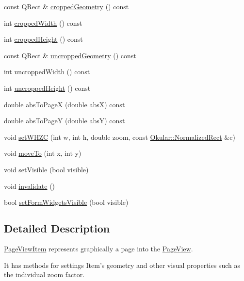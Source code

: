 \begin{DoxyCompactItemize}
\item 
const Q\+Rect \& \hyperlink{classPageViewItem_aa2c3e988ccbe9ee162b73d7f89ab0d02}{cropped\+Geometry} () const 
\item 
int \hyperlink{classPageViewItem_a94c289b7fcbadf14d0b06a68589aa72a}{cropped\+Width} () const 
\item 
int \hyperlink{classPageViewItem_a4e74bfd4a2f4afaf8e905c59293b4978}{cropped\+Height} () const 
\item 
const Q\+Rect \& \hyperlink{classPageViewItem_a5d2e73a003f65b4e95c0c21b1698f835}{uncropped\+Geometry} () const 
\item 
int \hyperlink{classPageViewItem_a240924407ae22bb0489363a6a2d481b9}{uncropped\+Width} () const 
\item 
int \hyperlink{classPageViewItem_af1380fce5dc13a72458ef834c720b128}{uncropped\+Height} () const 
\item 
double \hyperlink{classPageViewItem_ac8c32541cbae1efd5b4ab54f0a4b4576}{abs\+To\+Page\+X} (double abs\+X) const 
\item 
double \hyperlink{classPageViewItem_afdbba9ce015155c0e655efbb23e5d13b}{abs\+To\+Page\+Y} (double abs\+Y) const 
\item 
void \hyperlink{classPageViewItem_a9bd1865804399e1c5cf54ee5871f173a}{set\+W\+H\+Z\+C} (int w, int h, double zoom, const \hyperlink{classOkular_1_1NormalizedRect}{Okular\+::\+Normalized\+Rect} \&c)
\item 
void \hyperlink{classPageViewItem_a0c23111c6e56e5198b5f25518fb4f9bf}{move\+To} (int x, int y)
\item 
void \hyperlink{classPageViewItem_aa5e5ccb0e93d2ab16f6785503ff1ed21}{set\+Visible} (bool visible)
\item 
void \hyperlink{classPageViewItem_aae4d30e1d447c96f8fb12ed27316d0f5}{invalidate} ()
\item 
bool \hyperlink{classPageViewItem_ae022a536fc5d7fd23a20253b1544ae76}{set\+Form\+Widgets\+Visible} (bool visible)
\end{DoxyCompactItemize}


\subsection{Detailed Description}
\hyperlink{classPageViewItem}{Page\+View\+Item} represents graphically a page into the \hyperlink{classPageView}{Page\+View}. 

It has methods for settings Item's geometry and other visual properties such as the individual zoom factor. 

